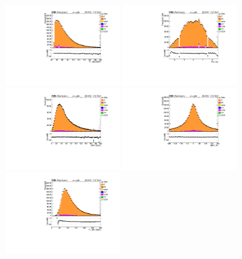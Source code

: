 \begin{figure}
  \centering
  \includegraphics[width=0.45\textwidth]{fig/app4/ele/Pt_lep.pdf}
  \includegraphics[width=0.45\textwidth]{fig/app4/ele/Eta_lep.pdf} \\
  \includegraphics[width=0.45\textwidth]{fig/app4/ele/MET_E.pdf}
  \includegraphics[width=0.45\textwidth]{fig/app4/ele/MET_Pz.pdf}
  \includegraphics[width=0.45\textwidth]{fig/app4/ele/PtJet1.pdf}

\end{figure}
